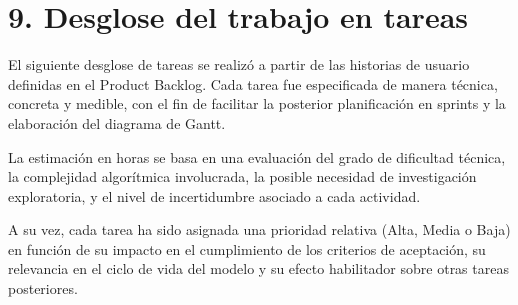 \documentclass[
11pt, %
]{charter}
\begin{document}
\section{9. Desglose del trabajo en tareas}
\label{sec:wbs}

El siguiente desglose de tareas se realizó a partir de las historias de usuario definidas en el Product Backlog. Cada tarea fue especificada de manera técnica, concreta y medible, con el fin de facilitar la posterior planificación en sprints y la elaboración del diagrama de Gantt.

La estimación en horas se basa en una evaluación del grado de dificultad técnica, la complejidad algorítmica involucrada, la posible necesidad de investigación exploratoria, y el nivel de incertidumbre asociado a cada actividad.

A su vez, cada tarea ha sido asignada una prioridad relativa (Alta, Media o Baja) en función de su impacto en el cumplimiento de los criterios de aceptación, su relevancia en el ciclo de vida del modelo y su efecto habilitador sobre otras tareas posteriores.
\end{document}

